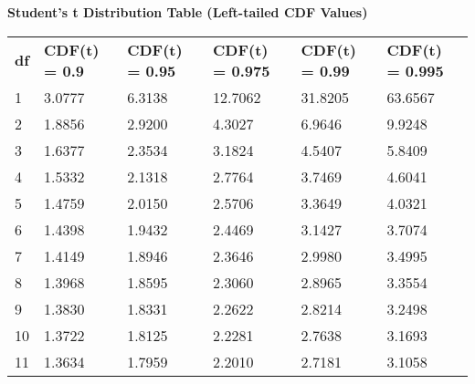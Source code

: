 \documentclass[letterpage]{article}
\begin{document}
\vspace{2em}
\centering
\textbf{Student's t Distribution Table (Left-tailed CDF Values)}

\small

\begin{table}[ht!]
\renewcommand{\arraystretch}{1.2}
\centering
\begin{tabular}{|p{}|p{}|p{}|p{}|p{}|p{}|}
\cline{1-1} \cline{2-2} \cline{3-3} \cline{4-4} \cline{5-5} \cline{6-6}
\textbf{df} & \textbf{CDF(t) = 0.9} & \textbf{CDF(t) = 0.95} & \textbf{CDF(t) = 0.975} & \textbf{CDF(t) = 0.99} & \textbf{CDF(t) = 0.995} \\ \cline{1-1} \cline{2-2} \cline{3-3} \cline{4-4} \cline{5-5} \cline{6-6}
1 & 3.0777 & 6.3138 & 12.7062 & 31.8205 & 63.6567 \\ \cline{1-1} \cline{2-2} \cline{3-3} \cline{4-4} \cline{5-5} \cline{6-6}
2 & 1.8856 & 2.9200 & 4.3027 & 6.9646 & 9.9248 \\ \cline{1-1} \cline{2-2} \cline{3-3} \cline{4-4} \cline{5-5} \cline{6-6}
3 & 1.6377 & 2.3534 & 3.1824 & 4.5407 & 5.8409 \\ \cline{1-1} \cline{2-2} \cline{3-3} \cline{4-4} \cline{5-5} \cline{6-6}
4 & 1.5332 & 2.1318 & 2.7764 & 3.7469 & 4.6041 \\ \cline{1-1} \cline{2-2} \cline{3-3} \cline{4-4} \cline{5-5} \cline{6-6}
5 & 1.4759 & 2.0150 & 2.5706 & 3.3649 & 4.0321 \\ \cline{1-1} \cline{2-2} \cline{3-3} \cline{4-4} \cline{5-5} \cline{6-6}
6 & 1.4398 & 1.9432 & 2.4469 & 3.1427 & 3.7074 \\ \cline{1-1} \cline{2-2} \cline{3-3} \cline{4-4} \cline{5-5} \cline{6-6}
7 & 1.4149 & 1.8946 & 2.3646 & 2.9980 & 3.4995 \\ \cline{1-1} \cline{2-2} \cline{3-3} \cline{4-4} \cline{5-5} \cline{6-6}
8 & 1.3968 & 1.8595 & 2.3060 & 2.8965 & 3.3554 \\ \cline{1-1} \cline{2-2} \cline{3-3} \cline{4-4} \cline{5-5} \cline{6-6}
9 & 1.3830 & 1.8331 & 2.2622 & 2.8214 & 3.2498 \\ \cline{1-1} \cline{2-2} \cline{3-3} \cline{4-4} \cline{5-5} \cline{6-6}
10 & 1.3722 & 1.8125 & 2.2281 & 2.7638 & 3.1693 \\ \cline{1-1} \cline{2-2} \cline{3-3} \cline{4-4} \cline{5-5} \cline{6-6}
11 & 1.3634 & 1.7959 & 2.2010 & 2.7181 & 3.1058 \\ \cline{1-1} \cline{2-2} \cline{3-3} \cline{4-4} \cline{5-5} \cline{6-6}

\end{tabular}
\end{table}
\end{document}
